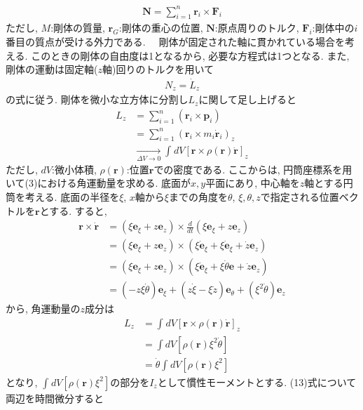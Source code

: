 \documentclass{jlreq}
\begin{document}
\begin{align}
\bm{N} = \sum_{i=1}^{n} \bm{r}_i \times \bm{F}_i
\end{align}
ただし, $M$:剛体の質量, $\bm{r}_G$:剛体の重心の位置, $\bm{N}$:原点周りのトルク, $\bm{F}_i$:剛体中の$i$番目の質点が受ける外力である.
　剛体が固定された軸に貫かれている場合を考える. このときの剛体の自由度は1となるから, 必要な方程式は1つとなる. また, 剛体の運動は固定軸($z$軸)回りのトルクを用いて
\begin{align}
    N_z = \dot{L}_z
\end{align}
の式に従う. 剛体を微小な立方体に分割し$L_z$に関して足し上げると
\begin{align}
    L_z &= \sum_{i=1}^{n} (\bm{r}_i \times \bm{p}_i)\\
        &= \sum_{i=1}^{n} (\bm{r}_i \times m_i \dot{\bm{r}}_i)_z\\
        &\xrightarrow[\Delta V \to 0]{} \int_{}^{} dV[\bm{r} \times \rho(\bm{r})\dot{\bm{r}}]_z
\end{align}
ただし, $dV$:微小体積, $\rho(\bm{r})$:位置$\bm{r}$での密度である. ここからは, 円筒座標系を用いて(3)における角運動量を求める. 底面が$x,y$平面にあり, 中心軸を$z$軸とする円筒を考える. 底面の半径を$\xi$, $x$軸から$\xi$までの角度を$\theta$, $\xi, \theta, z$で指定される位置ベクトルを$\bm{r}$とする. すると,
\begin{align}
    \bm{r} \times \dot{\bm{r}} &= (\xi \bm{e}_{\xi} + z \bm{e}_z) \times \frac{d}{dt}(\xi \bm{e}_{\xi} + z \bm{e}_z)\\
                               &= (\xi \bm{e}_{\xi} + z \bm{e}_z) \times (\xi \dot{\bm{e}}_{\xi} + \xi \dot{\bm{e}}_{\xi} + \dot{z} \bm{e}_z)\\
                               &= (\xi \bm{e}_{\xi} + z \bm{e}_z) \times (\xi \dot{\bm{e}}_{\xi} + \xi \dot{\theta} \bm{e}_{} + \dot{z} \bm{e}_z)\\
                               &= (-z \xi \dot{\theta}) \bm{e}_{\xi} + (z \dot{\xi} - \xi \dot{z}) \bm{e}_{\theta} + ({\xi}^2 \dot{\theta}) \bm{e}_z
\end{align}
から, 角運動量の$z$成分は
\begin{align}
    L_z &= \int_{}^{} dV [\bm{r} \times \rho(\bm{r}) \dot{\bm{r}}]_z\\
        &= \int dV [\rho(\bm{r}) {\xi}^2 \dot{\theta}]\\
        &= \dot{\theta} \int_{}^{} dV [\rho(\bm{r}) {\xi}^2]
\end{align}
となり, $\int_{}^{} dV [\rho(\bm{r}) {\xi}^2]$の部分を$I_z$として慣性モーメントとする. (13)式について両辺を時間微分すると
\end{document}
